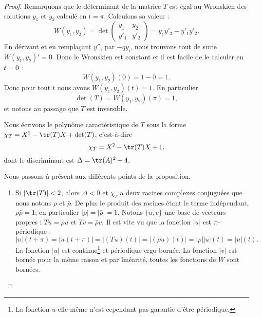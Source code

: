 \begin{proof}
	Remarquons que le déterminant de la matrice \( T\) est égal au Wronskien des solutions \( y_1\) et \( y_2\) calculé en \( t=\pi\). Calculons sa valeur :
	\begin{equation}
		W(y_1,y_2)=\det\begin{pmatrix}
			y_1  & y_2  \\
			y'_1 & y'_2
		\end{pmatrix}=y_1y'_2-y'_1y'_2.
	\end{equation}
	En dérivant et en remplaçant \( y''_i\) par \( -qy_i\), nous trouvons tout de suite \( W(y_1,y_2)'=0\). Donc le Wronskien est constant et il est facile de le calculer en \( t=0\) :
	\begin{equation}
		W(y_1,y_2)(0)=1-0=1.
	\end{equation}
	Donc pour tout \( t\) nous avons \( W(y_1,y_2)(t)=1\). En particulier
	\begin{equation}
		\det(T)=W(y_1,y_2)(\pi)=1,
	\end{equation}
	et notons au passage que \( T\) est inversible.

	Nous écrivons le polynôme caractéristique de \( T\) sous la forme \( \chi_T=X^2-\tr(T)X+\det(T)\), c'est-à-dire
	\begin{equation}
		\chi_T=X^2-\tr(T)X+1,
	\end{equation}
	dont le discriminant est \( \Delta=\tr(A)^2-4\).

	Nous passons à présent aux différents points de la proposition.
	\begin{enumerate}
		\item
		      Si \( | \tr(T) |<2\), alors \( \Delta<0\) et \( \chi_T\) a deux racines complexes conjuguées que nous notons \( \rho\) et \( \bar\rho\). De plus le produit des racines étant le terme indépendant, \( \rho\bar\rho=1\); en particulier \( | \rho |=| \bar \rho |=1\). Notons \( \{ u,v \}\) une base de vecteurs propres : \( Tu=\rho u\) et \( Tv=\bar \rho v\). Il est vite vu que la fonction \( | u |\) est \( \pi\)-périodique :
		      \begin{equation}
			      | u |(t+\pi)=| u(t+\pi) |=| (Tu)(t) |=| (\rho u)(t) |=| \rho | | u |(t)=| u |(t).
		      \end{equation}
		      La fonction \( | u |\) est continue\footnote{La fonction \( u\) elle-même n'est cependant pas garantie d'être périodique.} et périodique ergo bornée. La fonction \( | v |\) est bornée pour la même raison et par linéarité, toutes les fonctions de \( W\) sont bornées.


\end{enumerate}
\end{proof}
